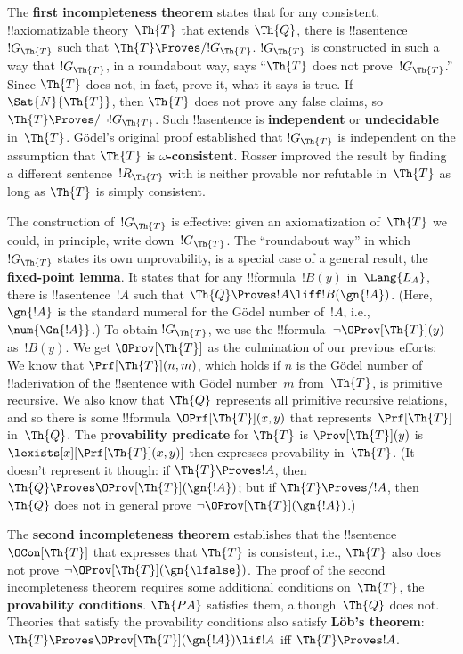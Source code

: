 The \textbf{first incompleteness theorem} states that for any
consistent, !!{axiomatizable} theory~$\Th{T}$ that extends $\Th{Q}$,
there is !!a{sentence}~$!G_\Th{T}$ such that $\Th{T} \Proves/
!G_\Th{T}$. $!G_\Th{T}$ is constructed in such a way that $!G_\Th{T}$,
in a roundabout way, says ``$\Th{T}$ does not prove~$!G_\Th{T}$.''
Since $\Th{T}$ does not, in fact, prove it, what it says is true. If
$\Sat{N}{\Th{T}}$, then $\Th{T}$ does not prove any false claims, so
$\Th{T} \Proves/ \lnot !G_\Th{T}$. Such !!a{sentence} is
\textbf{independent} or \textbf{undecidable} in~$\Th{T}$.  G\"odel's
original proof established that $!G_\Th{T}$ is independent on the
assumption that $\Th{T}$ is \textbf{$\omega$-consistent}. Rosser
improved the result by finding a different sentence~$!R_\Th{T}$ with
is neither provable nor refutable in~$\Th{T}$ as long as $\Th{T}$ is
simply consistent.

The construction of~$!G_\Th{T}$ is effective: given an axiomatization
of~$\Th{T}$ we could, in principle, write down~$!G_\Th{T}$. The
``roundabout way'' in which $!G_\Th{T}$ states its own unprovability,
is a special case of a general result, the \textbf{fixed-point
  lemma}. It states that for any !!{formula}~$!B(y)$ in~$\Lang{L_A}$,
there is !!a{sentence}~$!A$ such that $\Th{Q} \Proves !A \liff
!B(\gn{!A})$. (Here, $\gn{!A}$ is the standard numeral for the G\"odel
number of~$!A$, i.e., $\num{\Gn{!A}}$.)  To obtain $!G_\Th{T}$, we use
the !!{formula}~$\lnot\OProv[\Th{T}](y)$ as~$!B(y)$.  We get
$\OProv[\Th{T}]$ as the culmination of our previous efforts: We know
that $\Prf[\Th{T}](n, m)$, which holds if $n$ is the G\"odel number of
!!a{derivation} of the !!{sentence} with G\"odel number~$m$
from~$\Th{T}$, is primitive recursive. We also know that $\Th{Q}$
represents all primitive recursive relations, and so there is some
!!{formula} $\OPrf[\Th{T}](x,y)$ that represents~$\Prf[\Th{T}]$
in~$\Th{Q}$.  The \textbf{provability predicate} for $\Th{T}$ is
$\Prov[\Th{T}](y)$ is $\lexists[x][\Prf[\Th{T}](x, y)]$ then expresses
provability in~$\Th{T}$. (It doesn't represent it though: if $\Th{T}
\Proves !A$, then $\Th{Q} \Proves \OProv[\Th{T}](\gn{!A})$; but if
$\Th{T} \Proves/ !A$, then $\Th{Q}$ does not in general prove $\lnot
\OProv[\Th{T}](\gn{!A})$.)

The \textbf{second incompleteness theorem} establishes that the
!!{sentence}~$\OCon[\Th{T}]$ that expresses that $\Th{T}$ is
consistent, i.e., $\Th{T}$ also does not prove
$\lnot \OProv[\Th{T}](\gn{\lfalse})$.  The proof of the second
incompleteness theorem requires some additional conditions
on~$\Th{T}$, the
\textbf{provability conditions}. $\Th{PA}$ satisfies them,
although~$\Th{Q}$ does not.  Theories that satisfy the provability
conditions also satisfy \textbf{L\"ob's theorem}: $\Th{T} \Proves
\OProv[\Th{T}](\gn{!A}) \lif !A$ iff $\Th{T} \Proves !A$.

